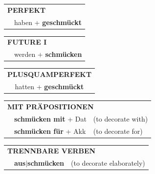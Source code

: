 \documentclass[10pt,a4paper]{revtex4-2}
\begin{document}
\begin{verbbox}
\vspace{10pt}

\begin{tabular}{rl}
\multicolumn{2}{l}{\textbf{PERFEKT}}\\
& haben + \textbf{geschmückt}\\
\end{tabular}
\hfill
\begin{tabular}{rl}
\multicolumn{2}{l}{\textbf{FUTURE I}}\\
& werden + \textbf{schmücken}\\
\end{tabular}
\hfill
\begin{tabular}{rl}
\multicolumn{2}{l}{\textbf{PLUSQUAMPERFEKT}}\\
& hatten + \textbf{geschmückt}\\
\end{tabular}

\vspace{10pt}

\begin{tabular}{lll}
\multicolumn{3}{l}{\textbf{MIT PRÄPOSITIONEN}}\\
& \textbf{schmücken mit} + Dat & (to decorate with)\\
& \textbf{schmücken für} + Akk & (to decorate for)\\
\end{tabular}
\hfill
\begin{tabular}{lll}
\multicolumn{3}{l}{\textbf{TRENNBARE VERBEN}}\\
& \textbf{aus$|$schmücken} & (to decorate elaborately)\\
\end{tabular}
\vspace{-5pt}
\end{verbbox}
\end{document}
